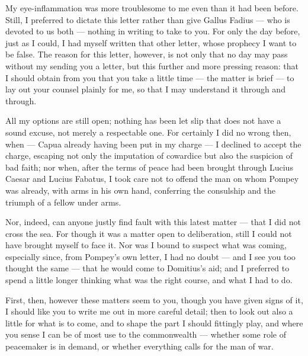 

 My eye-inflammation was more troublesome to me even than it had been before. Still, I preferred to dictate this letter rather than give Gallus Fadius --- who is devoted to us both --- nothing in writing to take to you. For only the day before, just as I could, I had myself written that other letter, whose prophecy I want to be false. The reason for this letter, however, is not only that no day may pass without my sending you a letter, but this further and more pressing reason: that I should obtain from you that you take a little time --- the matter is brief --- to lay out your counsel plainly for me, so that I may understand it through and through.

 All my options are still open; nothing has been let slip that does not have a sound excuse, not merely a respectable one. For certainly I did no wrong then, when --- Capua already having been put in my charge --- I declined to accept the charge, escaping not only the imputation of cowardice but also the suspicion of bad faith; nor when, after the terms of peace had been brought through Lucius Caesar and Lucius Fabatus, I took care not to offend the man on whom Pompey was already, with arms in his own hand, conferring the consulship and the triumph of a fellow under arms.

 Nor, indeed, can anyone justly find fault with this latest matter --- that I did not cross the sea. For though it was a matter open to deliberation, still I could not have brought myself to face it. Nor was I bound to suspect what was coming, especially since, from Pompey's own letter, I had no doubt --- and I see you too thought the same --- that he would come to Domitius's aid; and I preferred to spend a little longer thinking what was the right course, and what I had to do.

 First, then, however these matters seem to you, though you have given signs of it, I should like you to write me out in more careful detail; then to look out also a little for what is to come, and to shape the part I should fittingly play, and where you sense I can be of most use to the commonwealth --- whether some role of peacemaker is in demand, or whether everything calls for the man of war.

